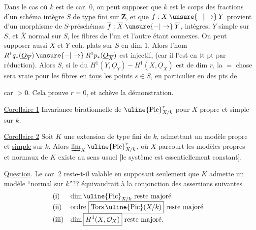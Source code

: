 Dans le cas où $k$ est de car. $0$, on peut supposer que $k$ est
le corps des fractions d'un schéma intègre $S$ de type fini sur $\mathbf Z$,
et que $f:X\mathbin{\unsure{-|\to}}Y$ provient d'un morphisme de
$S$-préschémas $\overline f:\overline X\mathbin{\unsure{-|\to}}\overline Y$,
intègres, $\overline Y$ simple sur $S$, et $\overline X$
 normal sur $S$, les fibres de l'un et l'autre étant
 connexes.
On peut supposer aussi $X$ et $Y$ coh. plats sur $S$ en dim $1$,
Alors 
l'hom
$R^1q_*(\underline O_{\overline Y})\mathbin{\unsure{-|\to}}
R^1p_*(\underline O_{\overline X})$
est injectif, 
(car il l'est en tt pt par réduction).
Alors  $S$, si le 
du $H^1(Y,\underline O_Y)\mathbin{-}H^1(X,\underline O_X)$
est de dim $r$, la $=$ chose sera vraie pour les fibres en \uline{tous}
les points $s\in S$, en particulier en des pts de

car $>0$. Cela prouve $r=0$, et achève la démonstration.

\uline{Corollaire 1} Invariance birationnelle de $\uline{\mathrm{Pic}}^\tau_{X/k}$
pour $X$ propre et simple sur $k$.

\uline{Corollaire 2} Soit $K$ une extension
de type fini de $k$, admettant un modèle 
propre et \uline{simple} sur $k$. Alors
$\varinjlim_X\uline{\mathrm{Pic}}^\tau_{X/k}$, où $X$ parcourt
les modèles propres et normaux  de $K$
existe au sens usuel [le système 
est essentiellement constant].


\uline{Question}. Le cor. 2 reste-t-il valable
en supposant seulement que $K$ admette
un modèle ``normal sur $k$''??
 équivaudrait à la conjonction des
assertions suivantes
\[
\begin{array}{ll}
\text{(i)}&\dim\uline{\mathrm{Pic}}_{X/k}\text{ reste majoré}\\
\text{(ii)}&\text{ordre }\boxed{\mathrm{Tors}\,\uline{\mathrm{Pic}}(X/k)}
                    \text{ reste majoré}\\
\text{(iii)}&\dim\boxed{H^1(X,\mathcal O_X)}\text{ reste majoré.}
\end{array}
\]

